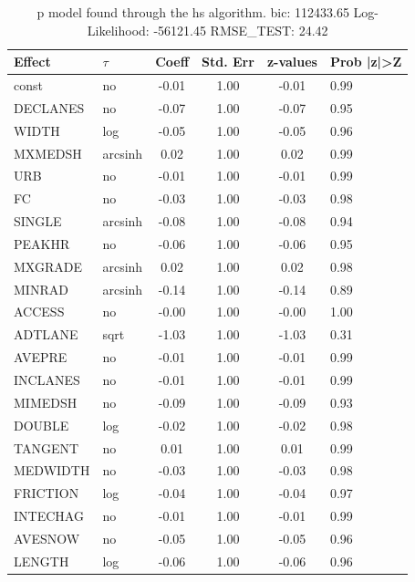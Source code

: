 \begin{table}
	\caption{p model found through the hs algorithm. bic: 112433.65 Log-Likelihood: -56121.45 RMSE_TEST: 24.42}
	\begin{center}
		\begin{tabular}{|l|l|c|c|c|l|}
			\hline
			Effect & $\tau$ & Coeff & Std. Err & z-values & Prob |z|>Z \\
			\hline
			const & no & -0.01 & 1.00 & -0.01 & 0.99 \\
			\hline
			DECLANES & no & -0.07 & 1.00 & -0.07 & 0.95 \\
			\hline
			WIDTH & log & -0.05 & 1.00 & -0.05 & 0.96 \\
			\hline
			MXMEDSH & arcsinh & 0.02 & 1.00 & 0.02 & 0.99 \\
			\hline
			URB & no & -0.01 & 1.00 & -0.01 & 0.99 \\
			\hline
			FC & no & -0.03 & 1.00 & -0.03 & 0.98 \\
			\hline
			SINGLE & arcsinh & -0.08 & 1.00 & -0.08 & 0.94 \\
			\hline
			PEAKHR & no & -0.06 & 1.00 & -0.06 & 0.95 \\
			\hline
			MXGRADE & arcsinh & 0.02 & 1.00 & 0.02 & 0.98 \\
			\hline
			MINRAD & arcsinh & -0.14 & 1.00 & -0.14 & 0.89 \\
			\hline
			ACCESS & no & -0.00 & 1.00 & -0.00 & 1.00 \\
			\hline
			ADTLANE & sqrt & -1.03 & 1.00 & -1.03 & 0.31 \\
			\hline
			AVEPRE & no & -0.01 & 1.00 & -0.01 & 0.99 \\
			\hline
			INCLANES & no & -0.01 & 1.00 & -0.01 & 0.99 \\
			\hline
			MIMEDSH & no & -0.09 & 1.00 & -0.09 & 0.93 \\
			\hline
			DOUBLE & log & -0.02 & 1.00 & -0.02 & 0.98 \\
			\hline
			TANGENT & no & 0.01 & 1.00 & 0.01 & 0.99 \\
			\hline
			MEDWIDTH & no & -0.03 & 1.00 & -0.03 & 0.98 \\
			\hline
			FRICTION & log & -0.04 & 1.00 & -0.04 & 0.97 \\
			\hline
			INTECHAG & no & -0.01 & 1.00 & -0.01 & 0.99 \\
			\hline
			AVESNOW & no & -0.05 & 1.00 & -0.05 & 0.96 \\
			\hline
			LENGTH & log & -0.06 & 1.00 & -0.06 & 0.96 \\
			\hline

\end{tabular}
\end{center}
\end{table}
